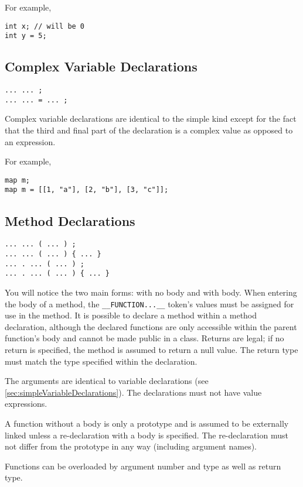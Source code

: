 \documentclass[10pt,a4paper]{article}
\begin{document}
For example,
\begin{verbatim}
int x; // will be 0
int y = 5;
\end{verbatim}

\subsection{Complex Variable Declarations}
\label{sec:complexVariableDeclarations}
\begin{verbatim}
... ... ;
... ... = ... ;
\end{verbatim}

Complex variable declarations are identical to the simple kind except for the fact that the third and final part of the declaration is a complex value as opposed to an expression.

For example,
\begin{verbatim}
map m;
map m = [[1, "a"], [2, "b"], [3, "c"]];
\end{verbatim}

\subsection{Method Declarations}
\label{sec:methodDeclarations}
\begin{verbatim}
... ... ( ... ) ;
... ... ( ... ) { ... }
... . ... ( ... ) ;
... . ... ( ... ) { ... }
\end{verbatim}

You will notice the two main forms: with no body and with body. When entering the body of a method, the \verb|__FUNCTION...__| token's values must be assigned for use in the method. It is possible to declare a method within a method declaration, although the declared functions are only accessible within the parent function's body and cannot be made public in a class. Returns are legal; if no return is specified, the method is assumed to return a null value. The return type must match the type specified within the declaration.

The arguments are identical to variable declarations (see \ref{sec:simpleVariableDeclarations}). The declarations must not have value expressions.

A function without a body is only a prototype and is assumed to be externally linked unless a re-declaration with a body is specified. The re-declaration must not differ from the prototype in any way (including argument names).

Functions can be overloaded by argument number and type as well as return type.
\end{document}
